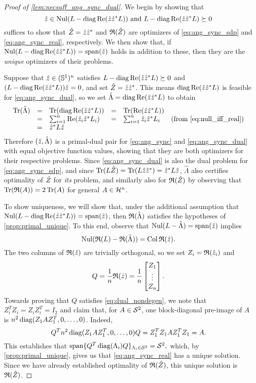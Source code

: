 \begin{proof}[Proof of \cref{lem:necsuff_ang_sync_dual}]
  We begin by showing that \[\hat{z} \in \operatorname{Nul}(L -  \operatorname{diag} \operatorname{Re}(\hat{z} \hat{z}^* L)) \ \text{and} \ L - \operatorname{diag} \operatorname{Re}(\hat{z} \hat{z}^* L) \succeq 0 \] suffices to show that $\hat{Z} = \hat{z} \hat{z}^*$ and $\mathfrak{R}(\hat{Z})$ are optimizers of \eqref{eq:ang_sync_sdp} and \eqref{eq:ang_sync_real}, respectively.  We then show that, if $\operatorname{Nul}(L -  \operatorname{diag} \operatorname{Re}(\hat{z} \hat{z}^* L)) = \operatorname{span}(\hat{z})$ holds in addition to these, then they are the \emph{unique} optimizers of their problems.

  Suppose that $\hat{z} \in (\mathbb{S}^1)^n$ satisfies $L - \operatorname{diag} \operatorname{Re}(\hat{z} \hat{z}^* L) \succeq 0$ and $(L - \operatorname{diag} \operatorname{Re}(\hat{z} \hat{z}^* L))\hat{z} = 0$, and set $\hat{Z} = \hat{z} \hat{z}^*$.  This means $\operatorname{diag} \operatorname{Re} (\hat{z} \hat{z}^* L)$ is feasible for \eqref{eq:ang_sync_dual}, so we set $\hat{\Lambda} = \operatorname{diag} \operatorname{Re}(\hat{z} \hat{z}^* L)$ to obtain
  \[
  \begin{array}{rclcll}
    \operatorname{Tr}(\hat{\Lambda}) & = & \operatorname{Tr}(\operatorname{diag}\operatorname{Re}(\hat{z} \hat{z}^* L))& = & \operatorname{Tr}(\operatorname{Re}(\hat{z} \hat{z}^* L)) \\
    & = & \sum_{i = 1}^n \operatorname{Re}(\hat{z}_i \hat{z}^* L_i) & = & \sum_{i = 1}^n \hat{z}_i \hat{z}^* L_i & \text{(from \eqref{eq:null_iff_real})} \\
    & = & \hat{z}^* L \hat{z}
  \end{array}
  \]
  Therefore $(\hat{z}, \hat{\Lambda})$ is a primal-dual pair for \eqref{eq:ang_sync} and \eqref{eq:ang_sync_dual} with equal objective function values, showing that they are both optimizers for their respective problems.  Since \eqref{eq:ang_sync_dual} is also the dual problem for \eqref{eq:ang_sync_sdp}, and since $\operatorname{Tr}(L \hat{Z}) = \operatorname{Tr}(L \hat{z} \hat{z}^*) = \hat{z}^* L \hat{z}$, $\hat{\Lambda}$ also certifies optimality of $\hat{Z}$ for \emph{its} problem, and similarly also for $\mathfrak{R}(\hat{Z})$ by observing that
 $\operatorname{Tr}(\mathfrak{R}(A)) = 2 \operatorname{Tr}(A)$ for general $A \in \mathcal{H}^n$.

  To show uniqueness, we will show that, under the additional assumption that $\operatorname{Nul}(L -  \operatorname{diag} \operatorname{Re}(\hat{z} \hat{z}^* L)) = \operatorname{span}(\hat{z})$, then $\mathfrak{R}(\hat{\Lambda})$ satisfies the hypotheses of \cref{prop:primal_unique}.  To this end, observe that $\operatorname{Nul}(L - \hat{\Lambda}) = \operatorname{span}(\hat{z})$ implies \[\operatorname{Nul}(\mathfrak{R}(L) - \mathfrak{R}(\hat{\Lambda})) = \operatorname{Col} \mathfrak{R}(\hat{z}).\]  The two columns of $\mathfrak{R}(\hat{z})$ are trivially orthogonal, so we set $Z_i = \mathfrak{R}(\hat{z}_i)$ and \[Q = \frac{1}{n} \mathfrak{R}(\hat{z}) = \frac{1}{n} \begin{bmatrix} Z_1 \\ \vdots \\ Z_n \end{bmatrix}.\] Towards proving that $Q$ satisfies \eqref{eq:dual_nondegen}, we note that $Z_i^T Z_i = Z_i Z_i^T = I_2$ and claim that, for $A \in \mathcal{S}^2$, one block-diagonal pre-image of $A$ is $n^2 \operatorname{diag}(Z_1 A Z_1^T, 0, \ldots, 0)$.  Indeed, \[Q^T n^2 \operatorname{diag}(Z_1 A Z_1^T, 0, \ldots, 0) Q = Z_1^T Z_1 A Z_1^T Z_1 = A.\]  This establishes that $\operatorname{span}\{Q^T \operatorname{diag}(\Lambda_i) Q\}_{\Lambda_i \in \mathcal{S}^2} = \mathcal{S}^2,$ which, by \cref{prop:primal_unique}, gives us that \eqref{eq:ang_sync_real} has a unique solution.  Since we have already established optimality of $\mathfrak{R}(\hat{Z})$, this unique solution is $\mathfrak{R}(\hat{Z})$.


\end{proof}
